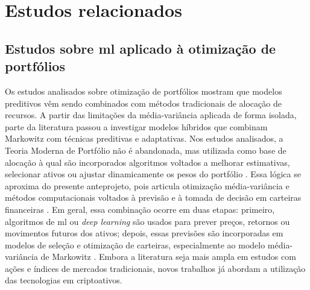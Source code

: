 




\chapter{Estudos relacionados}
\label{chap_estudos_relacionados}

\section{Estudos sobre \acl{ml} aplicado à otimização de portfólios}
\label{sec_estudos_sobre_machine_learning_aplicado_a_otimizacao_de_portfolios}

Os estudos analisados sobre otimização de portfólios mostram que modelos preditivos vêm sendo combinados com métodos tradicionais de alocação de recursos. A partir das limitações da média-variância aplicada de forma isolada, parte da literatura passou a investigar modelos híbridos que combinam Markowitz com técnicas preditivas e adaptativas. Nos estudos analisados, a Teoria Moderna de Portfólio não é abandonada, mas utilizada como base de alocação à qual são incorporados algoritmos voltados a melhorar estimativas, selecionar ativos ou ajustar dinamicamente os pesos do portfólio \cite{chaweewanchon2022markowitz,du2022mean,lopez2025enhancing}. Essa lógica se aproxima do presente anteprojeto, pois articula otimização média-variância e métodos computacionais voltados à previsão e à tomada de decisão em carteiras financeiras \cite{chaweewanchon2022markowitz,slusarczyk2025optimal,lopez2025enhancing}. Em geral, essa combinação ocorre em duas etapas: primeiro, algoritmos de \acl{ml} ou \textit{deep learning} são usados para prever preços, retornos ou movimentos futuros dos ativos; depois, essas previsões são incorporadas em modelos de seleção e otimização de carteiras, especialmente ao modelo média-variância de Markowitz \cite{wang2020portfolio,chen2021mean,ma2021portfolio}. Embora a literatura seja mais ampla em estudos com ações e índices de mercados tradicionais, novos trabalhos já abordam a utilização das tecnologias em criptoativos.

